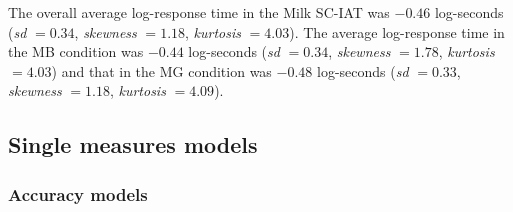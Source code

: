 \documentclass[12pt]{book}
\begin{document}
The overall average log-response time in the Milk SC-IAT was $-0.46$ log-seconds (\emph{sd} $= 0.34$, \emph{skewness} $= 1.18$, \emph{kurtosis} $= 4.03$). The average log-response time in the MB condition was $-0.44$ log-seconds (\emph{sd} $= 0.34$, \emph{skewness} $= 1.78$, \emph{kurtosis} $= 4.03$) and that in the MG condition was $-0.48$ log-seconds (\emph{sd} $= 0.33$, \emph{skewness} $= 1.18$, \emph{kurtosis} $= 4.09$).


\subsection{Single measures models} 

\subsubsection{Accuracy models}
\end{document}
